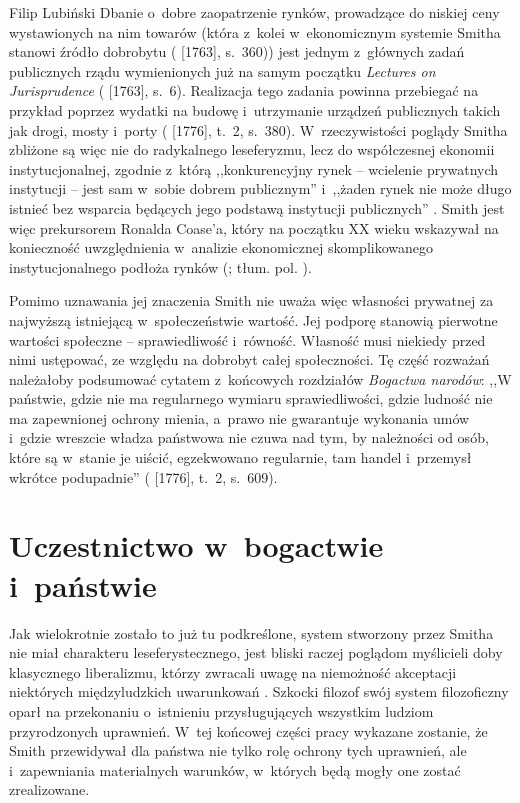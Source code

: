 \begin{artplenv}{Filip Lubiński}
Dbanie o~dobre zaopatrzenie rynków, prowadzące do niskiej ceny wystawionych na nim towarów
(która z~kolei w~ekonomicznym systemie Smitha stanowi źródło dobrobytu
(\cite{smith_lectures_1982} [1763], s.~360))
jest
jednym z~głównych zadań publicznych rządu wymienionych już na samym początku \textit{Lectures on Jurisprudence}
(\cite{smith_lectures_1982} [1763], s.~6).
Realizacja tego zadania powinna przebiegać na przykład poprzez
wydatki na budowę i~utrzymanie urządzeń publicznych takich jak drogi, mosty i~porty
(\cite{smith_badania_2007} [1776], t.~2, s.~380).
W~rzeczywistości poglądy Smitha zbliżone są więc nie do radykalnego leseferyzmu, lecz do
współczesnej ekonomii instytucjonalnej, zgodnie z~którą ,,konkurencyjny rynek -- wcielenie prywatnych instytucji -- jest
sam w~sobie dobrem publicznym'' i~,,żaden rynek nie może długo istnieć bez wsparcia będących jego podstawą instytucji
publicznych''
\parencite[s.~20]{ostrom_dysponowanie_2013}.
Smith jest więc prekursorem Ronalda Coase'a, który na
początku XX wieku wskazywał na konieczność uwzględnienia w~analizie ekonomicznej skomplikowanego instytucjonalnego
podłoża rynków
(\cite[s.~8]{coase_firm_1990}; tłum. pol. \cite*{coase_firma_2013}).

Pomimo uznawania jej znaczenia Smith nie uważa więc własności prywatnej za najwyższą istniejącą w~społeczeństwie
wartość. Jej podporę stanowią pierwotne wartości społeczne -- sprawiedliwość i~równość. Własność musi niekiedy przed
nimi ustępować, ze względu na dobrobyt całej społeczności. Tę część rozważań należałoby podsumować cytatem z~końcowych
rozdziałów \textit{Bogactwa narodów}: ,,W państwie, gdzie nie ma regularnego wymiaru sprawiedliwości, gdzie ludność nie
ma zapewnionej ochrony mienia, a~prawo nie gwarantuje wykonania umów i~gdzie wreszcie władza państwowa nie czuwa nad
tym, by należności od osób, które są w~stanie je uiścić, egzekwowano regularnie, tam handel i~przemysł wkrótce
podupadnie''
(\cite{smith_badania_2007} [1776], t.~2, s.~609).

\section{Uczestnictwo w~bogactwie i~państwie}
Jak wielokrotnie zostało to już tu podkreślone, system stworzony przez Smitha nie miał charakteru leseferystecznego,
jest bliski raczej poglądom myślicieli doby klasycznego liberalizmu, którzy zwracali uwagę na niemożność akceptacji
niektórych międzyludzkich uwarunkowań
\parencite[s.~215]{rawls_wyklady_2010}.
Szkocki filozof swój system
filozoficzny oparł na przekonaniu o~istnieniu przysługujących wszystkim ludziom przyrodzonych uprawnień. W~tej końcowej
części pracy wykazane zostanie, że Smith przewidywał dla państwa nie tylko rolę ochrony tych uprawnień,
ale i~zapewniania materialnych warunków, w~których będą mogły one zostać zrealizowane.


\end{artplenv}
